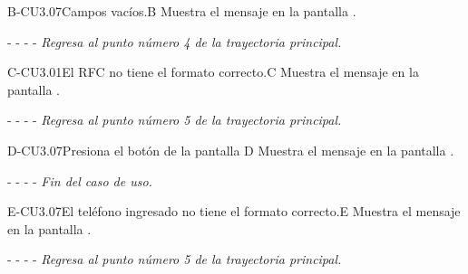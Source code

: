 	\begin{UCtrayectoriaA}{B-CU3.07}{Campos vacíos.}{B}
	    \UCpaso[\UCsist]Muestra el mensaje en la pantalla .
	    \item[- -] - - {\em Regresa al punto número 4 de la trayectoria principal.}
	\end{UCtrayectoriaA}

    
    \begin{UCtrayectoriaA}{C-CU3.01}{El RFC no tiene el formato correcto.}{C}
			\UCpaso[\UCsist] Muestra el mensaje  en la pantalla .
			\item[- -] - - {\em Regresa al punto número 5 de la trayectoria principal.} 
    \end{UCtrayectoriaA}

 
    
	\begin{UCtrayectoriaA}{D-CU3.07}{Presiona el botón  de la pantalla }{D}
		\UCpaso[\UCsist] Muestra el mensaje  en la pantalla .
		\item[- -] - - {\em Fin del caso de uso.} 
	\end{UCtrayectoriaA}
    
	\begin{UCtrayectoriaA}{E-CU3.07}{El teléfono ingresado no tiene el formato correcto.}{E}
			\UCpaso[\UCsist] Muestra el mensaje  en la pantalla .
			\item[- -] - - {\em Regresa al punto número 5 de la trayectoria principal.} 
    \end{UCtrayectoriaA}